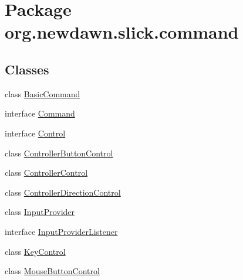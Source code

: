 \hypertarget{namespaceorg_1_1newdawn_1_1slick_1_1command}{}\section{Package org.\+newdawn.\+slick.\+command}
\label{namespaceorg_1_1newdawn_1_1slick_1_1command}
\subsection*{Classes}
\begin{DoxyCompactItemize}
\item 
class \mbox{\hyperlink{classorg_1_1newdawn_1_1slick_1_1command_1_1_basic_command}{Basic\+Command}}
\item 
interface \mbox{\hyperlink{interfaceorg_1_1newdawn_1_1slick_1_1command_1_1_command}{Command}}
\item 
interface \mbox{\hyperlink{interfaceorg_1_1newdawn_1_1slick_1_1command_1_1_control}{Control}}
\item 
class \mbox{\hyperlink{classorg_1_1newdawn_1_1slick_1_1command_1_1_controller_button_control}{Controller\+Button\+Control}}
\item 
class \mbox{\hyperlink{classorg_1_1newdawn_1_1slick_1_1command_1_1_controller_control}{Controller\+Control}}
\item 
class \mbox{\hyperlink{classorg_1_1newdawn_1_1slick_1_1command_1_1_controller_direction_control}{Controller\+Direction\+Control}}
\item 
class \mbox{\hyperlink{classorg_1_1newdawn_1_1slick_1_1command_1_1_input_provider}{Input\+Provider}}
\item 
interface \mbox{\hyperlink{interfaceorg_1_1newdawn_1_1slick_1_1command_1_1_input_provider_listener}{Input\+Provider\+Listener}}
\item 
class \mbox{\hyperlink{classorg_1_1newdawn_1_1slick_1_1command_1_1_key_control}{Key\+Control}}
\item 
class \mbox{\hyperlink{classorg_1_1newdawn_1_1slick_1_1command_1_1_mouse_button_control}{Mouse\+Button\+Control}}
\end{DoxyCompactItemize}
